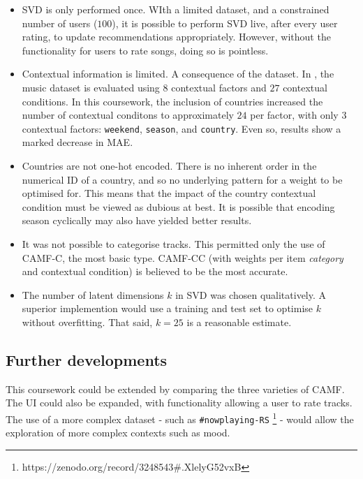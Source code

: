 \documentclass[conference]{IEEEtran}
\begin{document}
\begin{itemize}

\item{SVD is only performed once. WIth a limited dataset, and a constrained number of users ($100$), it is possible to perform SVD live, after every user rating, to update recommendations appropriately. However, without the functionality for users to rate songs, doing so is pointless.}
\item{Contextual information is limited. A consequence of the dataset. In \cite{baltrunas_et_al_2011}, the music dataset is evaluated using $8$ contextual factors and $27$ contextual conditions. In this coursework, the inclusion of countries increased the number of contextual conditons to approximately $24$ per factor, with only $3$ contextual factors: \verb|weekend|, \verb|season|, and \verb|country|. Even so, results show a marked decrease in MAE.}
\item{Countries are not one-hot encoded. There is no inherent order in the numerical ID of a country, and so no underlying pattern for a weight to be optimised for. This means that the impact of the country contextual condition must be viewed as dubious at best. It is possible that encoding season cyclically may also have yielded better results.}
\item{It was not possible to categorise tracks}. This permitted only the use of CAMF-C, the most basic type. CAMF-CC (with weights per item \textit{category} and contextual condition) is believed to be the most accurate.
\item{The number of latent dimensions $k$ in SVD was chosen qualitatively. A superior implemention would use a training and test set to optimise $k$ without overfitting. That said, $k = 25$ is a reasonable estimate.}

\end{itemize}

\subsection{Further developments}

This coursework could be extended by comparing the three varieties of CAMF. The UI could also be expanded, with functionality allowing a user to rate tracks. The use of a more complex dataset - such as \verb|#nowplaying-RS| \footnote{https://zenodo.org/record/3248543\#.XlelyG52vxB} - would allow the exploration of more complex contexts such as mood.
\end{document}
